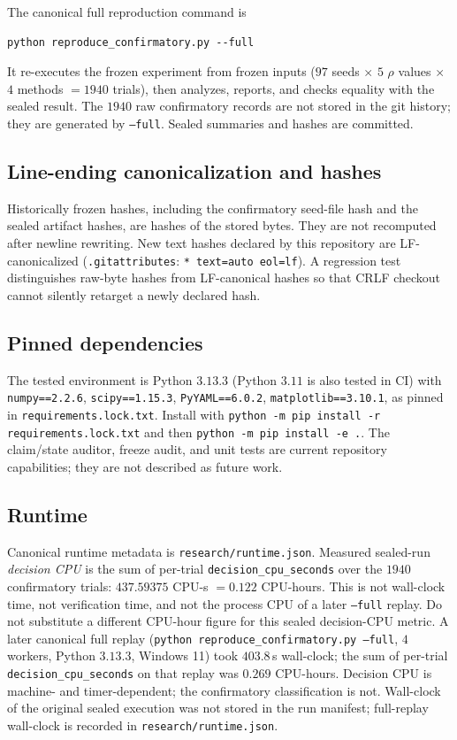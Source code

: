 \documentclass{article}
\begin{document}
The canonical full reproduction command is
\begin{verbatim}
python reproduce_confirmatory.py --full
\end{verbatim}
It re-executes the frozen experiment from frozen inputs ($97$ seeds $\times$ $5$ $\rho$ values $\times$ $4$ methods $= 1940$ trials), then analyzes, reports, and checks equality with the sealed result.
The $1940$ raw confirmatory records are not stored in the git history; they are generated by \texttt{--full}.
Sealed summaries and hashes are committed.

\subsection{Line-ending canonicalization and hashes}
Historically frozen hashes, including the confirmatory seed-file hash and the sealed artifact hashes, are hashes of the stored bytes.
They are not recomputed after newline rewriting.
New text hashes declared by this repository are LF-canonicalized (\texttt{.gitattributes}: \texttt{* text=auto eol=lf}).
A regression test distinguishes raw-byte hashes from LF-canonical hashes so that CRLF checkout cannot silently retarget a newly declared hash.

\subsection{Pinned dependencies}
The tested environment is Python $3.13.3$ (Python $3.11$ is also tested in CI) with
\texttt{numpy==2.2.6}, \texttt{scipy==1.15.3}, \texttt{PyYAML==6.0.2}, \texttt{matplotlib==3.10.1},
as pinned in \texttt{requirements.lock.txt}.
Install with \texttt{python -m pip install -r requirements.lock.txt} and then \texttt{python -m pip install -e .}.
The claim/state auditor, freeze audit, and unit tests are current repository capabilities; they are not described as future work.

\subsection{Runtime}
Canonical runtime metadata is \texttt{research/runtime.json}.
Measured sealed-run \emph{decision CPU} is the sum of per-trial \texttt{decision\_cpu\_seconds} over the $1940$ confirmatory trials:
$\mathbf{437.59375}$ CPU-s $= \mathbf{0.122}$ CPU-hours.
This is not wall-clock time, not verification time, and not the process CPU of a later \texttt{--full} replay.
Do not substitute a different CPU-hour figure for this sealed decision-CPU metric.
A later canonical full replay (\texttt{python reproduce\_confirmatory.py --full}, $4$ workers, Python $3.13.3$, Windows 11) took $403.8$\,s wall-clock; the sum of per-trial \texttt{decision\_cpu\_seconds} on that replay was $0.269$ CPU-hours.
Decision CPU is machine- and timer-dependent; the confirmatory classification is not.
Wall-clock of the original sealed execution was not stored in the run manifest; full-replay wall-clock is recorded in \texttt{research/runtime.json}.
\end{document}
